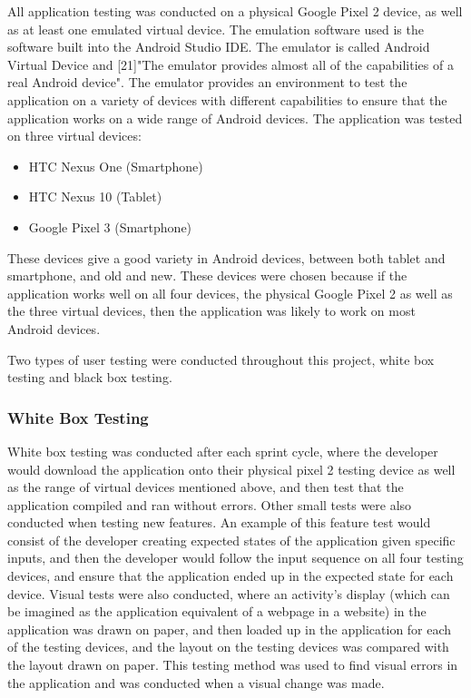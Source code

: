 \documentclass{article}
\begin{document}
All application testing was conducted on a physical Google Pixel 2 device, as well as at least one emulated virtual device. The emulation software used is the software built into the Android Studio IDE. The emulator is called Android Virtual Device and [21]"The emulator provides almost all of the capabilities of a real Android device". The emulator provides an environment to test the application on a variety of devices with different capabilities to ensure that the application works on a wide range of Android devices. The application was tested on three virtual devices: 

\begin{itemize}
	\item HTC Nexus One (Smartphone)
	\item HTC Nexus 10 (Tablet)
	\item Google Pixel 3 (Smartphone)
\end{itemize}

These devices give a good variety in Android devices, between both tablet and smartphone, and old and new. These devices were chosen because if the application works well on all four devices, the physical Google Pixel 2 as well as the three virtual devices, then the application was likely to work on most Android devices. \par

Two types of user testing were conducted throughout this project, white box testing and black box testing. \par 

\subsubsection{White Box Testing}

White box testing was conducted after each sprint cycle, where the developer would download the application onto their physical pixel 2 testing device as well as the range of virtual devices mentioned above, and then test that the application compiled and ran without errors. Other small tests were also conducted when testing new features. An example of this feature test would consist of the developer creating expected states of the application given specific inputs, and then the developer would follow the input sequence on all four testing devices, and ensure that the application ended up in the expected state for each device. Visual tests were also conducted, where an activity's display (which can be imagined as the application equivalent of a webpage in a website) in the application was drawn on paper, and then loaded up in the application for each of the testing devices, and the layout on the testing devices was compared with the layout drawn on paper. This testing method was used to find visual errors in the application and was conducted when a visual change was made. \par
\end{document}
